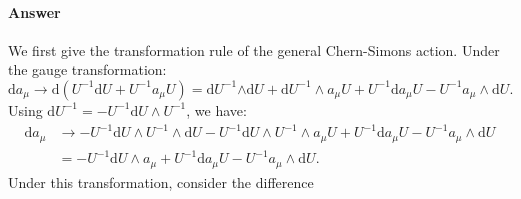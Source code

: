 \documentclass{book}
\begin{document}
\paragraph{Answer}
We first give the transformation rule of the general Chern-Simons action. Under the gauge transformation:
\begin{equation*}
\mathrm{d} a_{\mu }\rightarrow \mathrm{d} (U^{-1}\mathrm{d} U+U^{-1} a_{\mu } U)=\mathrm{d} U^{-1}\mathrm{\land d} U+\mathrm{d} U^{-1} \land a_{\mu } U+U^{-1}\mathrm{d} a_{\mu } U-U^{-1} a_{\mu } \land \mathrm{d} U.
\end{equation*}
Using $\mathrm{d} U^{-1} =-U^{-1}\mathrm{d} U\land U^{-1}$, we have:
\begin{equation*}
\begin{aligned}
\mathrm{d} a_{\mu } & \rightarrow -U^{-1}\mathrm{d} U\land U^{-1} \land \mathrm{d} U-U^{-1}\mathrm{d} U\land U^{-1} \land a_{\mu } U+U^{-1}\mathrm{d} a_{\mu } U-U^{-1} a_{\mu } \land \mathrm{d} U\\
 & =-U^{-1}\mathrm{d} U\land a_{\mu } +U^{-1}\mathrm{d} a_{\mu } U-U^{-1} a_{\mu } \land \mathrm{d} U.
\end{aligned}
\end{equation*}
Under this transformation, consider the difference
\end{document}
